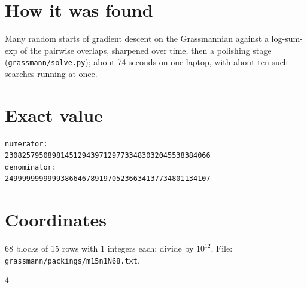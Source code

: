 \documentclass[11pt,a4paper]{article}
\begin{document}
\section{How it was found}
Many random starts of gradient descent on the Grassmannian against a log-sum-exp of the pairwise overlaps, sharpened over time, then a polishing stage (\texttt{grassmann/solve.py}); about 74 seconds on one laptop, with about ten such searches running at once.


\appendix
\section{Exact value}
{\small
\begin{verbatim}
numerator:
230825795089814512943971297733483032045538384066
denominator:
249999999999938664678919705236634137734801134107
\end{verbatim}}

\section{Coordinates}
68 blocks of 15 rows with 1 integers each; divide by $10^{12}$. File: \texttt{grassmann/packings/m15n1N68.txt}.
{\tiny
\begin{multicols}{4}
\end{multicols}}
\end{document}
